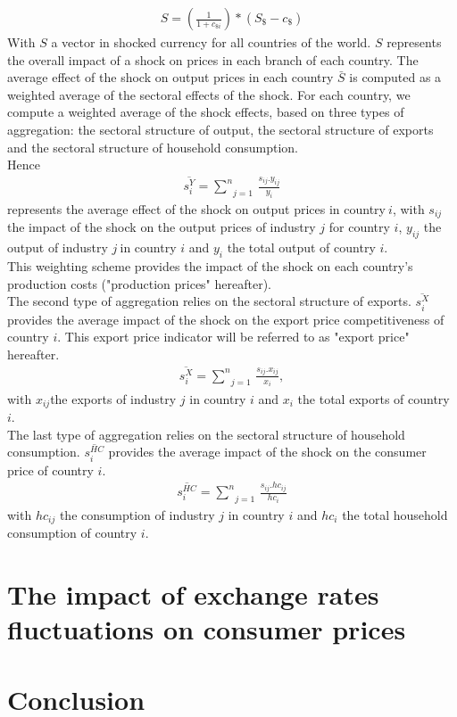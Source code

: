 \documentclass[11pt,a4paper]{article}
\begin{document}
\begin{eqnarray*}
	S=\left( \frac{1}{1+{{c}_{\$i}}}\right)*\left({{S}_{\$}}-{{c}_{\$}}\right)
\end{eqnarray*}
With $S$ a vector in shocked currency for all countries of the world. $S$ represents the overall impact of a shock on prices in each branch of each country. The average effect of the shock on output prices in each country $\bar{S}$ is computed as a weighted average of the sectoral effects of the shock. For each country, we compute a weighted average of the shock effects, based on three types of aggregation: the sectoral structure of output, the sectoral structure of exports and the sectoral structure of household consumption.\\
Hence 
\begin{eqnarray*}
\overline{s_{i}^{Y}}=\underset{j=1}{\overset{n}{\mathop \sum }}\,\frac{{{s}_{ij}}.{{y}_{ij}}}{{{y}_{i}}}
 \end{eqnarray*}
represents the average effect of the shock on output prices in country$~i$, with ${{{s}}_{{ij}}}$ the impact of the shock on the output prices of industry $j$ for country $i$, ${{{y}}_{{ij}}}$ the output of industry $j~$in country $i$ and ${{{y}}_{{i}}}$ the total output of country $i$. \\
This weighting scheme provides the impact of the shock on each country's production costs ("production prices" hereafter).\\
The second type of aggregation relies on the sectoral structure of exports. $\overline{s_{i}^{X}}$ provides the average impact of the shock on the export price competitiveness of country $i$. This export price indicator will be referred to as "export price" hereafter. \\
 \begin{eqnarray*}
\overline{s_{i}^{X}}=\underset{j=1}{\overset{n}{\mathop \sum }}\,\frac{{{s}_{ij}}.{{x}_{ij}}}{{{x}_{i}}},
 \end{eqnarray*} 
with $x_{ij}$the exports of industry $j$ in country $i$ and $x_{i}$ the total exports of country $i$. \\
The last type of aggregation relies on the sectoral structure of household consumption. $\overline{s_{i}^{HC}}$ provides the average impact of the shock on the consumer price of country $i$. 
 \begin{eqnarray*}
\overline{s_{i}^{HC}}=\underset{j=1}{\overset{n}{\mathop \sum }}\,\frac{{{s}_{ij}}.h{{c}_{ij}}}{h{{c}_{i}}}
 \end{eqnarray*} 
with $hc_{ij}$ the consumption of industry $j$ in country $i$ and ${h}{{{c}}_{{i}}}$ the total household consumption of country $i$. 
\section{The impact of exchange rates fluctuations on consumer prices}
\label{sec:prixconso}
\section{Conclusion}
\label{sec:ccl}
\newpage

\end{document}
